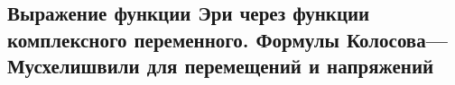 

\subsection{Выражение функции Эри через функции комплексного переменного. Формулы Колосова—Мусхелишвили для перемещений и напряжений}




